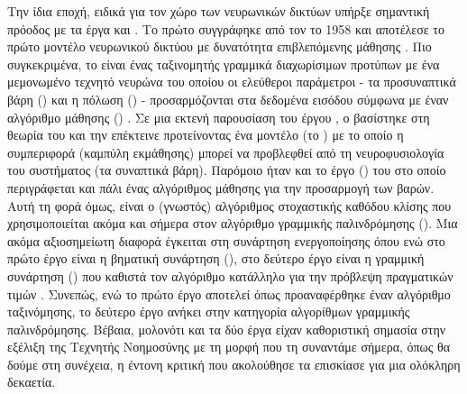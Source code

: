 Την ίδια εποχή, ειδικά για τον χώρο των νευρωνικών δικτύων υπήρξε σημαντική πρόοδος με τα έργα  και . Το πρώτο συγγράφηκε από τον  το 1958 και αποτέλεσε το πρώτο μοντέλο νευρωνικού δικτύου με δυνατότητα επιβλεπόμενης μάθησης . Πιο συγκεκριμένα, το  είναι ένας ταξινομητής γραμμικά διαχωρίσιμων προτύπων με ένα μεμονωμένο τεχνητό νευρώνα του οποίου οι ελεύθεροι παράμετροι - τα προσυναπτικά βάρη () και η πόλωση () - προσαρμόζονται στα δεδομένα εισόδου σύμφωνα με έναν αλγόριθμο μάθησης () \cite{haykin2009neural}. Σε μια εκτενή παρουσίαση του έργου \cite{rosenblatt1958perceptron}, ο  βασίστηκε στη θεωρία του  και την επέκτεινε προτείνοντας ένα μοντέλο (το ) με το οποίο η συμπεριφορά (καμπύλη εκμάθησης) μπορεί να προβλεφθεί από τη νευροφυσιολογία του συστήματος (τα συναπτικά βάρη). Παρόμοιο ήταν και το έργο  () του  στο οποίο περιγράφεται και πάλι ένας αλγόριθμος μάθησης για την προσαρμογή των βαρών. Αυτή τη φορά όμως, είναι ο (γνωστός) αλγόριθμος στοχαστικής καθόδου κλίσης  που χρησιμοποιείται ακόμα και σήμερα στον αλγόριθμο γραμμικής παλινδρόμησης (). Μια ακόμα αξιοσημείωτη διαφορά έγκειται στη συνάρτηση ενεργοποίησης όπου ενώ στο πρώτο έργο είναι η βηματική συνάρτηση (), στο δεύτερο έργο είναι η γραμμική συνάρτηση () που καθιστά τον αλγόριθμο κατάλληλο για την πρόβλεψη πραγματικών τιμών \cite{goodfellow2016deep, vinhas_2021}. Συνεπώς, ενώ το πρώτο έργο αποτελεί όπως προαναφέρθηκε έναν αλγόριθμο ταξινόμησης, το δεύτερο έργο ανήκει στην κατηγορία αλγορίθμων γραμμικής παλινδρόμησης. Βέβαια, μολονότι και τα δύο έργα είχαν καθοριστική σημασία στην εξέλιξη της Τεχνητής Νοημοσύνης με τη μορφή που τη συναντάμε σήμερα, όπως θα δούμε στη συνέχεια, η έντονη κριτική που ακολούθησε τα επισκίασε για μια ολόκληρη δεκαετία.
\par

